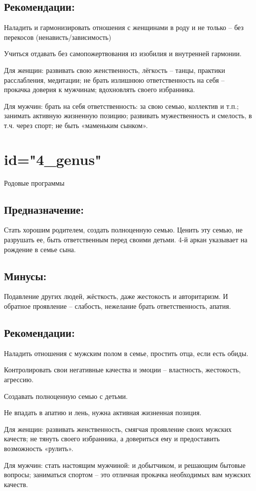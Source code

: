 \subsection{Рекомендации:}
\item Наладить и гармонизировать отношения с женщинами в роду и 
не только – без перекосов (ненависть/зависимость)
\item Учиться отдавать без самопожертвования из изобилия и 
внутренней гармонии.
\item Для женщин: развивать свою женственность, лёгкость – танцы, 
практики расслабления, медитации; не брать излишнюю ответственность 
на себя – прокачка доверия к мужчинам; вдохновлять своего избранника.
\item Для мужчин: брать на себя ответственность: за свою семью, 
коллектив и т.п.; занимать активную жизненную позицию; развивать 
мужественность и смелость, в т.ч. через спорт; не быть «маменьким 
сынком».
\endsubsection

\endsection

\section{id="4_genus"}{Родовые программы}

\subsection{Предназначение:}
Стать хорошим родителем, создать полноценную семью. Ценить эту 
семью, не разрушать ее, быть ответственным перед своими детьми.
4-й аркан указывает на рождение в семье сына.
\endsubsection

\subsection{Минусы:}
Подавление других людей, жёсткость, даже жестокость и авторитаризм. 
И обратное проявление – слабость, нежелание брать ответственность, 
апатия.
\endsubsection

\subsection{Рекомендации:}
\item Наладить отношения с мужским полом в семье, простить отца, 
если есть обиды.
\item Контролировать свои негативные качества и эмоции – властность, 
жестокость, агрессию.
\item Создавать полноценную семью с детьми.
\item Не впадать в апатию и лень, нужна активная жизненная позиция.
\item Для женщин: развивать женственность, смягчая проявление своих 
мужских качеств; не тянуть своего избранника, а довериться ему и 
предоставить возможность «рулить».
\item Для мужчин: стать настоящим мужчиной: и добытчиком, и решающим 
бытовые вопросы; заниматься спортом – это отличная прокачка необходимых 
вам мужских качеств.
\endsubsection

